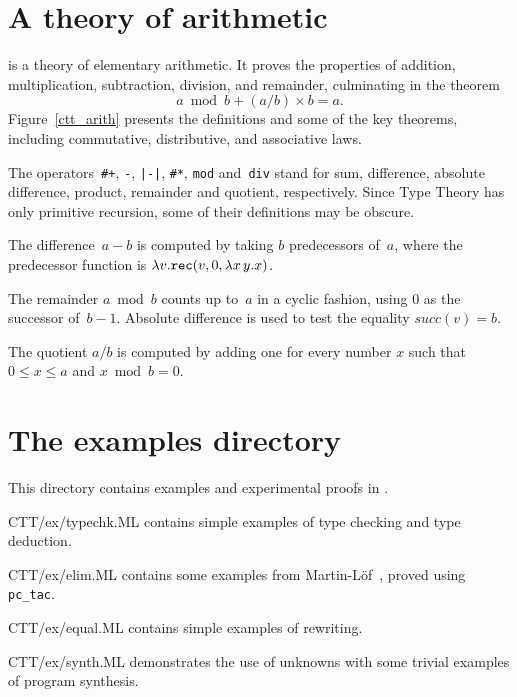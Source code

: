 \section{A theory of arithmetic}
 is a theory of elementary arithmetic.  It proves the
properties of addition, multiplication, subtraction, division, and
remainder, culminating in the theorem
\[ a \bmod b + (a/b)\times b = a. \]
Figure~\ref{ctt_arith} presents the definitions and some of the key
theorems, including commutative, distributive, and associative laws.

The operators~\verb'#+', \verb'-', \verb'|-|', \verb'#*', \verb'mod'
and~\verb'div' stand for sum, difference, absolute difference, product,
remainder and quotient, respectively.  Since Type Theory has only primitive
recursion, some of their definitions may be obscure.  

The difference~$a-b$ is computed by taking $b$ predecessors of~$a$, where
the predecessor function is $\lambda v. {\tt rec}(v, 0, \lambda x\,y. x)$.

The remainder $a\bmod b$ counts up to~$a$ in a cyclic fashion, using 0
as the successor of~$b-1$.  Absolute difference is used to test the
equality $succ(v)=b$.

The quotient $a/b$ is computed by adding one for every number $x$
such that $0\leq x \leq a$ and $x\bmod b = 0$.



\section{The examples directory}
This directory contains examples and experimental proofs in {\CTT}.
\begin{ttdescription}
\item[CTT/ex/typechk.ML]
contains simple examples of type checking and type deduction.

\item[CTT/ex/elim.ML]
contains some examples from Martin-L\"of~\cite{martinlof84}, proved using 
{\tt pc_tac}.

\item[CTT/ex/equal.ML]
contains simple examples of rewriting.

\item[CTT/ex/synth.ML]
demonstrates the use of unknowns with some trivial examples of program
synthesis. 
\end{ttdescription}


